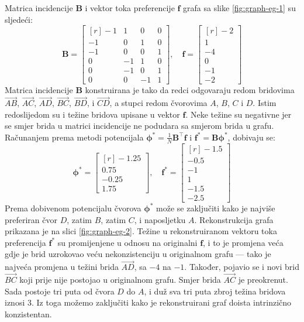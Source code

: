 \documentclass[lmodern, utf8, diplomski, numeric]{fer}
\newcommand{\matr}[1]{\mathbold{#1}}
\newcommand{\T}{\top}
\begin{document}
  Matrica incidencije $\matr{B}$ i vektor toka preferencije $\matr{f}$ grafa sa slike \ref{fig:graph-eg-1} su sljedeći:
  \begin{equation*}
  \matr{B} = \begin{bmatrix*}[r]
  -1 & 1 & 0 & 0 \\
  -1 & 0 & 1 & 0 \\
  -1 & 0 & 0 & 1 \\
  0 & -1 & 1 & 0 \\
  0 & -1 & 0 & 1 \\
  0 & 0 & -1 & 1
  \end{bmatrix*},\quad
  \matr{f} = \begin{bmatrix*}[r]
  -2 \\ 1 \\ -4 \\ 0 \\ -1 \\ -2
  \end{bmatrix*}
  \end{equation*}
  Matrica incidencije $\matr{B}$ konstruirana je tako da redci odgovaraju redom bridovima $\overrightarrow{AB}$, $\overrightarrow{AC}$, $\overrightarrow{AD}$, $\overrightarrow{BC}$, $\overrightarrow{BD}$, i $\overrightarrow{CD}$, a stupci redom čvorovima $A$, $B$, $C$ i $D$.
  Istim redoslijedom su i težine bridova upisane u vektor $\matr{f}$.
  Neke težine su negativne jer se smjer brida u matrici incidencije ne podudara sa smjerom brida u grafu.
  Računanjem prema metodi potencijala $\matr{\phi^*} = \frac{1}{N}\matr{B}^\T \matr{f}$ i $\matr{f^*} = \matr{B} \matr{\phi^*}$, dobivaju se:
  \begin{equation*}
  \matr{\phi}^* = \begin{bmatrix*}[r]
  -1.25 \\ 0.75 \\ -0.25 \\ 1.75
  \end{bmatrix*}, \quad
  \matr{f}^* = \begin{bmatrix*}[r]
  -1.5 \\ -0.5 \\ -1 \\ 1 \\ -1.5 \\ -2.5
  \end{bmatrix*}
  \end{equation*}
  Prema dobivenom potencijalu čvorova $\matr{\phi}^*$ može se zaključiti kako je najviše preferiran čvor $D$, zatim $B$, zatim $C$, i naposljetku $A$.
  Rekonstrukcija grafa prikazana je na slici \ref{fig:graph-eg-2}.
  Težine u rekonstruiranom vektoru toka preferencija $\matr{f}^*$ su promijenjene u odnosu na originalni $\matr{f}$, i to je promjena veća gdje je brid uzrokovao veću nekonzistenciju u originalnom grafu --- tako je najveća promjena u težini brida $\overrightarrow{AD}$, sa $-4$ na $-1$.
  Također, pojavio se i novi brid $\overrightarrow{BC}$ koji prije nije postojao u originalnom grafu.
  Smjer brida $\overrightarrow{AC}$ je preokrenut.
  Sada postoje tri puta od čvora $D$ do $A$, i duž sva tri puta zbroj težina bridova iznosi 3.
  Iz toga možemo zaključiti kako je rekonstruirani graf doista intrinzično konzistentan.
  
\end{document}
